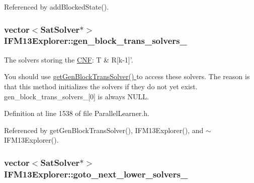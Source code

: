 Referenced by add\-Blocked\-State().

\hypertarget{classIFM13Explorer_a7cec81136159600cb4b65bbb8db0c8a5}{
\subsubsection[{gen\-\_\-block\-\_\-trans\-\_\-solvers\-\_\-}]{\setlength{\rightskip}{0pt plus 5cm}vector$<${\bf Sat\-Solver}$\ast$$>$ I\-F\-M13\-Explorer\-::gen\-\_\-block\-\_\-trans\-\_\-solvers\-\_\-\hspace{0.3cm}{\ttfamily [protected]}}}\label{classIFM13Explorer_a7cec81136159600cb4b65bbb8db0c8a5}


The solvers storing the \hyperlink{classCNF}{C\-N\-F}\-: T \& R\mbox{[}k-\/1\mbox{]}'. 

You should use \hyperlink{classIFM13Explorer_a04ebb206acd0dcf2d02f2e705eaec358}{get\-Gen\-Block\-Trans\-Solver() } to access these solvers. The reason is that this method initializes the solvers if they do not yet exist. gen\-\_\-block\-\_\-trans\-\_\-solvers\-\_\-\mbox{[}0\mbox{]} is always N\-U\-L\-L. 

Definition at line 1538 of file Parallel\-Learner.\-h.



Referenced by get\-Gen\-Block\-Trans\-Solver(), I\-F\-M13\-Explorer(), and $\sim$\-I\-F\-M13\-Explorer().

\hypertarget{classIFM13Explorer_aaa5c23d99524b6a0190212bd7abae6dd}{
\subsubsection[{goto\-\_\-next\-\_\-lower\-\_\-solvers\-\_\-}]{\setlength{\rightskip}{0pt plus 5cm}vector$<${\bf Sat\-Solver}$\ast$$>$ I\-F\-M13\-Explorer\-::goto\-\_\-next\-\_\-lower\-\_\-solvers\-\_\-\hspace{0.3cm}{\ttfamily [protected]}}}\label{classIFM13Explorer_aaa5c23d99524b6a0190212bd7abae6dd}


